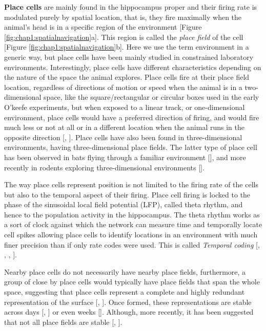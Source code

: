 \textbf{Place cells} are mainly found in the hippocampus proper and their firing rate is modulated purely by spatial location, that is, they fire maximally when the animal's head is in a specific region of the environment [Figure \ref{fig:chap1:spatialnavigation}a]. 
This region is called the \textit{place field} of the cell [Figure \ref{fig:chap1:spatialnavigation}b].  
Here we use the term environment in a generic way, but place cells have been mainly studied in constrained laboratory environments.
Interestingly, place cells have different characteristics depending on the nature of the space the animal explores.
Place cells fire at their place field location, regardless of directions of motion or speed when the animal is in a two-dimensional space, like the square/rectangular or circular boxes used in the early O'keefe experiments, but when exposed to a linear track, or one-dimensional environment, place cells would have a preferred direction of firing, and would fire much less or not at all or in a different location when the animal runs in the opposite direction [\cite{mcnaughton1983}, \cite{okeefe1993}].
Place cells have also been found in three-dimensional environments, having three-dimensional place fields.
The latter type of place cell has been observed in bats flying through a familiar environment [\cite{yartsev2013}], and more recently in rodents exploring three-dimensional environments [\cite{grieves2020}].

The way place cells represent position is not limited to the firing rate of the cells but also to the temporal aspect of their firing. 
Place cell firing is locked to the phase of the sinusoidal local field potential (LFP), called theta rhythm, and hence to the population activity in the hippocampus. 
The theta rhythm works as a sort of clock against which the network can measure time and temporally locate cell spikes allowing place cells to identify locations in an environment with much finer precision than if only rate codes were used.
This is called \textit{Temporal coding} [\cite{okeefe1993}, \cite{huxter2003}, \cite{buzsaki2004}, \cite{buzsaki2002}].

Nearby place cells do not necessarily have nearby place fields, furthermore, a group of close by place cells would typically have place fields that span the whole space, suggesting that place cells represent a complete and highly redundant representation of the surface [\cite{okeefe1976}, \cite{wilson1994}].
Once formed, these representations are stable across days [\cite{hill1978}, \cite{muller1987}] or even weeks [\cite{thompson1990}].
Although, more recently, it has been suggested that not all place fields are stable [\cite{mankin2015}, \cite{ziv2013}]. 

